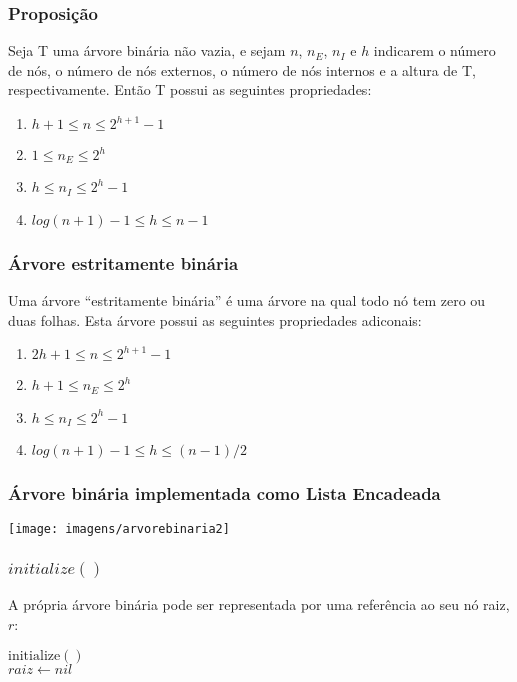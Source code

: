 \documentclass{beamer}
\begin{document}
\begin{frame}
\frametitle{Proposição}
Seja T uma árvore binária não vazia, e sejam $n$, $n_E$, $n_I$ e $h$ indicarem o número de nós, o número de nós externos, o número de nós internos e a altura de T, respectivamente. Então T possui as seguintes propriedades:
\begin{enumerate}
\item $h + 1 \leq n \leq 2^{h+1} - 1$
\item $1 \leq n_E \leq 2^h$
\item $h \leq n_I \leq 2^h - 1$
\item $log(n + 1) - 1 \leq h \leq n - 1$
\end{enumerate}

\end{frame}

\begin{frame}
\frametitle{Árvore estritamente binária}
Uma árvore ``estritamente binária'' é uma árvore na qual todo nó tem zero ou duas folhas. Esta árvore possui as seguintes propriedades adiconais:

\begin{enumerate}
\item $2h + 1 \leq n \leq 2^{h+1}  - 1$
\item $h + 1 \leq  n_E \leq  2^h$
\item $h \leq  n_I \leq  2^h - 1$
\item $log(n + 1) - 1 \leq  h \leq  (n - 1)/2$
\end{enumerate}

\end{frame}

\begin{frame}
\frametitle{Árvore binária implementada como Lista Encadeada}

\texttt{[image: imagens/arvorebinaria2]}

\end{frame}

\begin{frame}
\frametitle{$initialize()$}

A própria árvore binária pode ser representada por uma
referência ao seu nó raiz, $r$:
\begin{oframed}
\begin{flushleft}
\hspace*{1em} \ensuremath{\mathrm{initialize}()}\\
\hspace*{1em} \hspace*{1em} \ensuremath{\ensuremath{\mathit{raiz}} \gets  \ensuremath{nil}}\\
\end{flushleft}
\end{oframed}
\end{frame}
\end{document}
